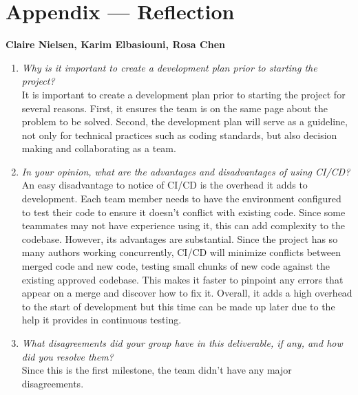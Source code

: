 \documentclass{article}
\begin{document}
\newpage{}

\section*{Appendix --- Reflection}

\textbf{Claire Nielsen, Karim Elbasiouni, Rosa Chen}
\begin{enumerate}
    \item \textit{Why is it important to create a development plan prior to starting the project?}\\
    It is important to create a development plan prior to starting the project for several reasons. First, it ensures the team is on the same page about the problem to be solved. Second, the development plan will serve as a guideline, not only for technical practices such as coding standards, but also decision making and collaborating as a team.
    \item \textit{In your opinion, what are the advantages and disadvantages of using CI/CD?}\\
    An easy disadvantage to notice of CI/CD is the overhead it adds to development. Each team member needs to have the environment configured to test their code to ensure it doesn’t conflict with existing code. Since some teammates may not have experience using it, this can add complexity to the codebase. However, its advantages are substantial. Since the project has so many authors working concurrently, CI/CD will minimize conflicts between merged code and new code, testing small chunks of new code against the existing approved codebase. This makes it faster to pinpoint any errors that appear on a merge and discover how to fix it. Overall, it adds a high overhead to the start of development but this time can be made up later due to the help it provides in continuous testing. 
    \item \textit{What disagreements did your group have in this deliverable, if any, and how did you resolve them?}\\
    Since this is the first milestone, the team didn’t have any major disagreements. 
\end{enumerate}
\end{document}
